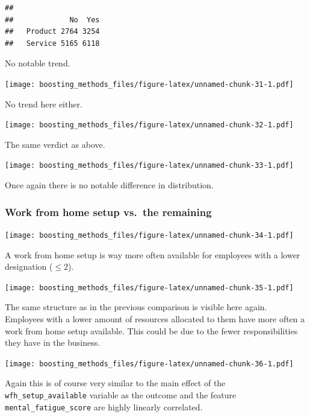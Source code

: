 \documentclass[
]{book}
\newenvironment{Shaded}{\begin{snugshade}}{\end{snugshade}}
\newcommand{\CommentTok}[1]{\textcolor[rgb]{0.56,0.35,0.01}{\textit{#1}}}
\newcommand{\FunctionTok}[1]{\textcolor[rgb]{0.00,0.00,0.00}{#1}}
\newcommand{\NormalTok}[1]{#1}
\newcommand{\SpecialCharTok}[1]{\textcolor[rgb]{0.00,0.00,0.00}{#1}}
\begin{document}
\begin{Shaded}
\end{Shaded}

\begin{verbatim}
##          
##             No  Yes
##   Product 2764 3254
##   Service 5165 6118
\end{verbatim}

No notable trend.

\texttt{[image: boosting\_methods\_files/figure-latex/unnamed-chunk-31-1.pdf]}

No trend here either.

\texttt{[image: boosting\_methods\_files/figure-latex/unnamed-chunk-32-1.pdf]}

The same verdict as above.

\texttt{[image: boosting\_methods\_files/figure-latex/unnamed-chunk-33-1.pdf]}

Once again there is no notable difference in distribution.

\hypertarget{work-from-home-setup-vs.-the-remaining}{%
\subsubsection{Work from home setup vs.~the remaining}\label{work-from-home-setup-vs.-the-remaining}}

\texttt{[image: boosting\_methods\_files/figure-latex/unnamed-chunk-34-1.pdf]}

A work from home setup is way more often available for employees with a lower designation (\(\leq 2\)).

\texttt{[image: boosting\_methods\_files/figure-latex/unnamed-chunk-35-1.pdf]}

The same structure as in the previous comparison is visible here again. Employees with a lower amount of resources allocated to them have more often a work from home setup available. This could be due to the fewer responsibilities they have in the business.

\texttt{[image: boosting\_methods\_files/figure-latex/unnamed-chunk-36-1.pdf]}

Again this is of course very similar to the main effect of the \texttt{wfh\_setup\_available} variable as the outcome and the feature \texttt{mental\_fatigue\_score} are highly linearly correlated.
\end{document}
